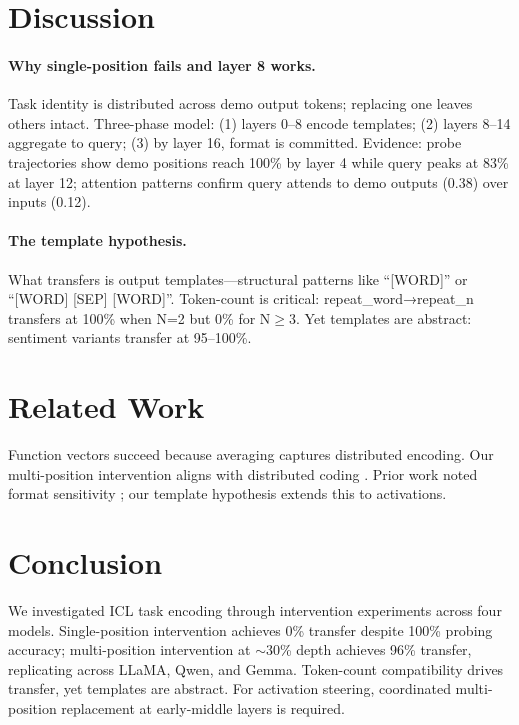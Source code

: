 \documentclass{article}
\begin{document}
\section{Discussion}

\paragraph{Why single-position fails and layer 8 works.}
Task identity is distributed across demo output tokens; replacing one leaves others intact. Three-phase model: (1) layers 0--8 encode templates; (2) layers 8--14 aggregate to query; (3) by layer 16, format is committed. Evidence: probe trajectories show demo positions reach 100\% by layer 4 while query peaks at 83\% at layer 12; attention patterns confirm query attends to demo outputs (0.38) over inputs (0.12).

\paragraph{The template hypothesis.}
What transfers is output templates---structural patterns like ``[WORD]'' or ``[WORD] [SEP] [WORD]''. Token-count is critical: repeat\_word→repeat\_n transfers at 100\% when N=2 but 0\% for N$\geq$3. Yet templates are abstract: sentiment variants transfer at 95--100\%.

\section{Related Work}
\label{sec:related}

Function vectors \citep{todd2023function,hendel2023context} succeed because averaging captures distributed encoding. Our multi-position intervention aligns with distributed coding \citep{hinton1986distributed}. Prior work noted format sensitivity \citep{lu2022fantastically,min2022rethinking}; our template hypothesis extends this to activations.

\section{Conclusion}
\label{sec:conclusion}

We investigated ICL task encoding through intervention experiments across four models. Single-position intervention achieves 0\% transfer despite 100\% probing accuracy; multi-position intervention at $\sim$30\% depth achieves 96\% transfer, replicating across LLaMA, Qwen, and Gemma. Token-count compatibility drives transfer, yet templates are abstract. For activation steering, coordinated multi-position replacement at early-middle layers is required.
\end{document}

